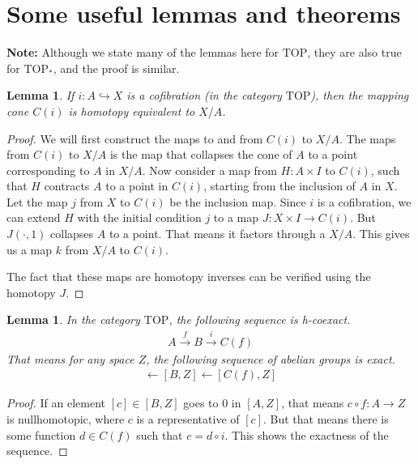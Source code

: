 \documentclass[12pt, notitlepage]{article}
\newtheorem{lem}[thm]{Lemma}
\theoremstyle{definition}
\newcommand{\cat}[1]{\mathrm{#1}}
\begin{document}
\section{Some useful lemmas and theorems}
\label{sec:some-useful-lemmas}

\textbf{Note:} Although we state many of the lemmas here for $\cat{TOP}$, they are also true for
$\cat{TOP}_{\ast}$, and the proof is similar.

\begin{lem}
  If $i: A \hookrightarrow X$ is a cofibration (in the category $\cat{TOP}$), then the mapping cone
  $C(i)$ is homotopy equivalent to $X/A$.
\end{lem}

\begin{proof}
  We will first construct the maps to and from $C(i)$ to $X/A$. The maps from $C(i)$ to $X/A$ is the
  map that collapses the cone of $A$ to a point corresponding to $A$ in $X/A$. Now consider a map
  from $H: A \times I$ to $C(i)$, such that $H$ contracts $A$ to a point in $C(i)$, starting from
  the inclusion of $A$ in $X$. Let the map $j$ from $X$ to $C(i)$ be the inclusion map. Since $i$ is
  a cofibration, we can extend $H$ with the initial condition $j$ to a map $J: X \times I \to
  C(i)$. But $J(\cdot, 1)$ collapses $A$ to a point. That means it factors through a $X/A$. This
  gives us a map $k$ from $X/A$ to $C(i)$.

  The fact that these maps are homotopy inverses can be verified  using the homotopy $J$.
\end{proof}

\begin{lem}
  In the category $\cat{TOP}$, the following sequence is h-coexact.
  \begin{align*}
    A \xrightarrow{f} B \xrightarrow{i} C(f)
  \end{align*}
  That means for any space $Z$, the following sequence of abelian groups is exact.
  \begin{align*}
    [A, Z] \leftarrow [B,Z] \leftarrow [C(f), Z]
  \end{align*}
\end{lem}

\begin{proof}
  If an element $[c] \in [B,Z]$ goes to $0$ in $[A, Z]$, that means $c \circ f: A \to Z$ is
  nullhomotopic, where $c$ is a representative of $[c]$. But that means there is some function
  $d \in C(f)$ such that $c = d \circ i$. This shows the exactness of the sequence.
\end{proof}
\end{document}
